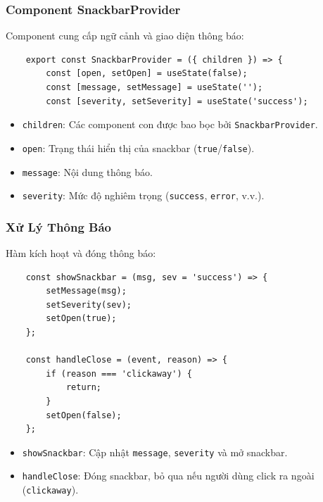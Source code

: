             \subsubsection{Component SnackbarProvider}
                \hspace*{0.6cm}Component cung cấp ngữ cảnh và giao diện thông báo:
                \begin{lstlisting}
    export const SnackbarProvider = ({ children }) => {
        const [open, setOpen] = useState(false);
        const [message, setMessage] = useState('');
        const [severity, setSeverity] = useState('success');
                \end{lstlisting}
                \begin{itemize}
                    \item \texttt{children}: Các component con được bao bọc bởi \texttt{SnackbarProvider}.
                    \item \texttt{open}: Trạng thái hiển thị của snackbar (\texttt{true}/\texttt{false}).
                    \item \texttt{message}: Nội dung thông báo.
                    \item \texttt{severity}: Mức độ nghiêm trọng (\texttt{success}, \texttt{error}, v.v.).
                \end{itemize}

            \subsubsection{Xử Lý Thông Báo}
                \hspace*{0.6cm}Hàm kích hoạt và đóng thông báo:
                \begin{lstlisting}
    const showSnackbar = (msg, sev = 'success') => {
        setMessage(msg);
        setSeverity(sev);
        setOpen(true);
    };

    const handleClose = (event, reason) => {
        if (reason === 'clickaway') {
            return;
        }
        setOpen(false);
    };
                \end{lstlisting}
                \begin{itemize}
                    \item \texttt{showSnackbar}: Cập nhật \texttt{message}, \texttt{severity} và mở snackbar.
                    \item \texttt{handleClose}: Đóng snackbar, bỏ qua nếu người dùng click ra ngoài (\texttt{clickaway}).
                \end{itemize}

